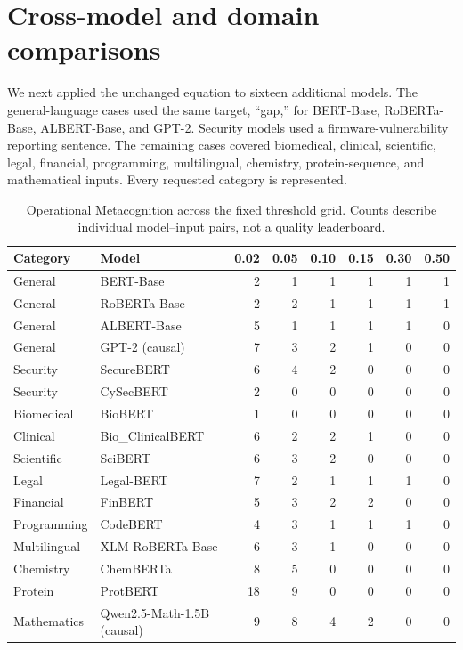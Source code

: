 \documentclass[11pt,a4paper]{article}
\begin{document}
\section{Cross-model and domain comparisons}
We next applied the unchanged equation to sixteen additional models. The general-language cases used the same target, ``gap,'' for BERT-Base, RoBERTa-Base, ALBERT-Base, and GPT-2. Security models used a firmware-vulnerability reporting sentence. The remaining cases covered biomedical, clinical, scientific, legal, financial, programming, multilingual, chemistry, protein-sequence, and mathematical inputs. Every requested category is represented.

\begin{table}[h]
\centering
\caption{Operational Metacognition across the fixed threshold grid. Counts describe individual model--input pairs, not a quality leaderboard.}
\label{tab:model-comparison}
{\scriptsize
\setlength{\tabcolsep}{4pt}
\begin{tabular}{llrrrrrr}
\toprule
Category & Model & 0.02 & 0.05 & 0.10 & 0.15 & 0.30 & 0.50 \\
\midrule
General & BERT-Base & 2 & 1 & 1 & 1 & 1 & 1 \\
General & RoBERTa-Base & 2 & 2 & 1 & 1 & 1 & 1 \\
General & ALBERT-Base & 5 & 1 & 1 & 1 & 1 & 0 \\
General & GPT-2 (causal) & 7 & 3 & 2 & 1 & 0 & 0 \\
Security & SecureBERT & 6 & 4 & 2 & 0 & 0 & 0 \\
Security & CySecBERT & 2 & 0 & 0 & 0 & 0 & 0 \\
Biomedical & BioBERT & 1 & 0 & 0 & 0 & 0 & 0 \\
Clinical & Bio\_ClinicalBERT & 6 & 2 & 2 & 1 & 0 & 0 \\
Scientific & SciBERT & 6 & 3 & 2 & 0 & 0 & 0 \\
Legal & Legal-BERT & 7 & 2 & 1 & 1 & 1 & 0 \\
Financial & FinBERT & 5 & 3 & 2 & 2 & 0 & 0 \\
Programming & CodeBERT & 4 & 3 & 1 & 1 & 1 & 0 \\
Multilingual & XLM-RoBERTa-Base & 6 & 3 & 1 & 0 & 0 & 0 \\
Chemistry & ChemBERTa & 8 & 5 & 0 & 0 & 0 & 0 \\
Protein & ProtBERT & 18 & 9 & 0 & 0 & 0 & 0 \\
Mathematics & Qwen2.5-Math-1.5B (causal) & 9 & 8 & 4 & 2 & 0 & 0 \\
\bottomrule
\end{tabular}
}
\end{table}
\end{document}
